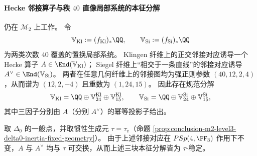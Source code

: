 \paragraph{Hecke 邻接算子与秩 \(40\) 直像局部系统的本征分解}
仍在 \(\mathcal M_2\) 上工作。
令
\[
\mathbb V_{\mathrm{Kl}}:=(f_{\mathrm{Kl}})_\ast \QQ,
\qquad
\mathbb V_{\mathrm{Si}}:=(f_{\mathrm{Si}})_\ast \QQ
\]
为两类次数 \(40\) 覆盖的置换局部系统。
Klingen 纤维上的正交邻接对应诱导一个 Hecke 算子 \(A\in \End(\mathbb V_{\mathrm{Kl}})\)；
Siegel 纤维上“相交于一条直线”的邻接对应诱导 \(A^\vee\in \End(\mathbb V_{\mathrm{Si}})\)。
两者在任意几何纤维上的邻接图均为强正则参数 \((40,12,2,4)\)，从而谱为 \((12,2,-4)\) 且重数为 \((1,24,15)\)。
因此存在规范分解
\[
\mathbb V_{\mathrm{Kl}}=\QQ\oplus \mathbb V_{24}^{\mathrm{Kl}}\oplus \mathbb V_{15}^{\mathrm{Kl}},
\qquad
\mathbb V_{\mathrm{Si}}=\QQ\oplus \mathbb V_{24}^{\mathrm{Si}}\oplus \mathbb V_{15}^{\mathrm{Si}},
\]
其中三因子分别由 \(A\)（分别 \(A^\vee\)）的幂等投影子给出。
\par
取 \(\Delta_0\) 的一般点，并取惯性生成元 \(\tau=\tau_v\)（命题 \ref{prop:conclusion-m2-level3-delta0-inertia-fixed-geometry}）。
由于上述邻接对应在 \(PSp(4,\FF_3)\) 作用下不变，\(A\) 与 \(A^\vee\) 均与 \(\tau\) 可交换，从而上述三块本征分解皆为 \(\tau\)-稳定。

